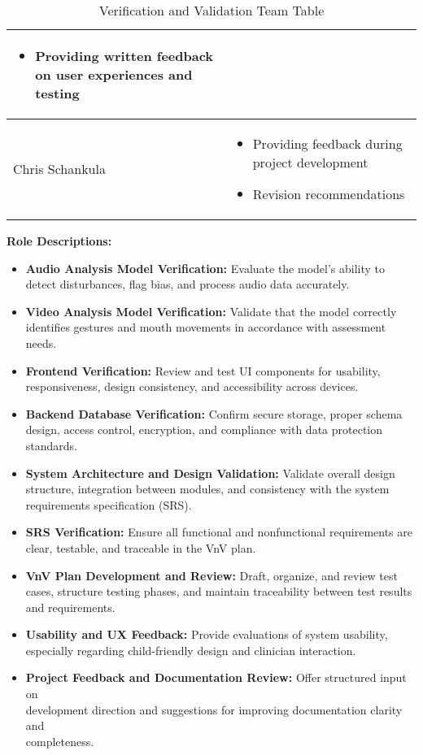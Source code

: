 \documentclass[12pt, titlepage]{article}
\begin{document}
\begin{table}[h!]
\begin{tabular}{ | m{5cm} | m{8cm} | }
\begin{itemize}
      \item Providing written feedback on user experiences and testing
    \end{itemize}\\
    \hline
    Chris Schankula & \vspace{2mm}\begin{itemize}
      \item Providing feedback during project development
      \item Revision recommendations
    \end{itemize}\\
    \bottomrule
  \end{tabular}
  \caption{Verification and Validation Team Table}
\end{table}

\vspace{1em}

\noindent\textbf{Role Descriptions:}
\begin{itemize}
  \item \textbf{Audio Analysis Model Verification:} Evaluate the model’s ability to detect disturbances, flag bias, and process audio data accurately.
  \item \textbf{Video Analysis Model Verification:} Validate that the model correctly identifies gestures and mouth movements in accordance with assessment needs.
  \item \textbf{Frontend Verification:} Review and test UI components for usability, responsiveness, design consistency, and accessibility across devices.
  \item \textbf{Backend Database Verification:} Confirm secure storage, proper schema design, access control, encryption, and compliance with data protection standards.
  \item \textbf{System Architecture and Design Validation:} Validate overall design structure, integration between modules, and consistency with the system requirements specification (SRS).
  \item \textbf{SRS Verification:} Ensure all functional and nonfunctional requirements are clear, testable, and traceable in the VnV plan.
  \item \textbf{VnV Plan Development and Review:} Draft, organize, and review test cases, structure testing phases, and maintain traceability between test results and requirements.
  \item \textbf{Usability and UX Feedback:} Provide evaluations of system usability, especially regarding child-friendly design and clinician interaction.
  \item \textbf{Project Feedback and Documentation Review:} Offer structured input on \\ development direction and suggestions for improving documentation clarity and \\ completeness.
\end{itemize}
\end{document}
